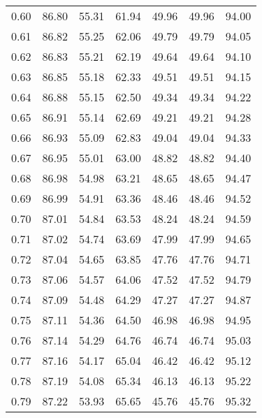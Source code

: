 \begin{tabular}{|c|c|c|c|c|c|c|}
      0.60 &     86.80 &     55.31 &      61.94 &   49.96 &      49.96 &         94.00 \\
      0.61 &     86.82 &     55.25 &      62.06 &   49.79 &      49.79 &         94.05 \\
      0.62 &     86.83 &     55.21 &      62.19 &   49.64 &      49.64 &         94.10 \\
      0.63 &     86.85 &     55.18 &      62.33 &   49.51 &      49.51 &         94.15 \\
      0.64 &     86.88 &     55.15 &      62.50 &   49.34 &      49.34 &         94.22 \\
      0.65 &     86.91 &     55.14 &      62.69 &   49.21 &      49.21 &         94.28 \\
      0.66 &     86.93 &     55.09 &      62.83 &   49.04 &      49.04 &         94.33 \\
      0.67 &     86.95 &     55.01 &      63.00 &   48.82 &      48.82 &         94.40 \\
      0.68 &     86.98 &     54.98 &      63.21 &   48.65 &      48.65 &         94.47 \\
      0.69 &     86.99 &     54.91 &      63.36 &   48.46 &      48.46 &         94.52 \\
      0.70 &     87.01 &     54.84 &      63.53 &   48.24 &      48.24 &         94.59 \\
      0.71 &     87.02 &     54.74 &      63.69 &   47.99 &      47.99 &         94.65 \\
      0.72 &     87.04 &     54.65 &      63.85 &   47.76 &      47.76 &         94.71 \\
      0.73 &     87.06 &     54.57 &      64.06 &   47.52 &      47.52 &         94.79 \\
      0.74 &     87.09 &     54.48 &      64.29 &   47.27 &      47.27 &         94.87 \\
      0.75 &     87.11 &     54.36 &      64.50 &   46.98 &      46.98 &         94.95 \\
      0.76 &     87.14 &     54.29 &      64.76 &   46.74 &      46.74 &         95.03 \\
      0.77 &     87.16 &     54.17 &      65.04 &   46.42 &      46.42 &         95.12 \\
      0.78 &     87.19 &     54.08 &      65.34 &   46.13 &      46.13 &         95.22 \\
      0.79 &     87.22 &     53.93 &      65.65 &   45.76 &      45.76 &         95.32 \\

\end{tabular}
